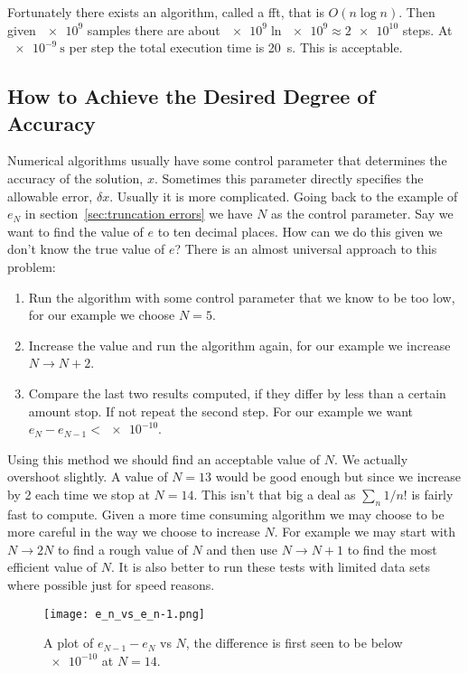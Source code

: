 \documentclass[a4paper]{article}
\begin{document}
    Fortunately there exists an algorithm, called a \acrfull{fft}, that is \(O(n\log n)\).
    Then given \(\num{e9}\) samples there are about \(\num{e9}\ln\num{e9} \approx \num{2e10}\) steps.
    At \(\SI{e-9}{\second}\) per step the total execution time is \SI{20}{\second}.
    This is acceptable.
    
    \subsection{How to Achieve the Desired Degree of Accuracy}
    Numerical algorithms usually have some control parameter that determines the accuracy of the solution, \(x\).
    Sometimes this parameter directly specifies the allowable error, \(\delta x\).
    Usually it is more complicated.
    Going back to the example of \(e_N\) in section~\ref{sec:truncation errors} we have \(N\) as the control parameter.
    Say we want to find the value of \(e\) to ten decimal places.
    How can we do this given we don't know the true value of \(e\)?
    There is an almost universal approach to this problem:
    \begin{enumerate}
        \item Run the algorithm with some control parameter that we know to be too low, for our example we choose \(N = 5\).
        \item Increase the value and run the algorithm again, for our example we increase \(N\to N + 2\).
        \item Compare the last two results computed, if they differ by less than a certain amount stop.
        If not repeat the second step.
        For our example we want \(e_N - e_{N-1} < \num{e-10}\).
    \end{enumerate}
    Using this method we should find an acceptable value of \(N\).
    We actually overshoot slightly.
    A value of \(N = 13\) would be good enough but since we increase by 2 each time we stop at \(N = 14\).
    This isn't that big a deal as \(\sum_n1/n!\) is fairly fast to compute.
    Given a more time consuming algorithm we may choose to be more careful in the way we choose to increase \(N\).
    For example we may start with \(N \to 2N\) to find a rough value of \(N\) and then use \(N \to N + 1\) to find the most efficient value of \(N\).
    It is also better to run these tests with limited data sets where possible just for speed reasons.
    
    \begin{figure}[ht]
        \centering
        \texttt{[image: e\_n\_vs\_e\_n-1.png]}
        \caption{A plot of \(e_{N-1} - e_N\) vs \(N\), the difference is first seen to be below \(\num{e-10}\) at \(N = 14\).}
    \end{figure}
\end{document}
